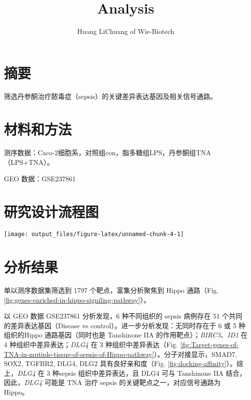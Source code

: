 \documentclass[
]{article}
\title{Analysis}
\author{Huang LiChuang of Wie-Biotech}
\date{}
\begin{document}
\maketitle

{
\setcounter{tocdepth}{3}
\tableofcontents
}
\listoffigures

\listoftables

\hypertarget{abstract}{%
\section{摘要}\label{abstract}}

筛选丹参酮治疗脓毒症（sepsis）的关键差异表达基因及相关信号通路。

\hypertarget{methods}{%
\section{材料和方法}\label{methods}}

测序数据：Caco-2细胞系，对照组con，脂多糖组LPS，丹参酮组TNA（LPS+TNA）。

GEO 数据：GSE237861

\hypertarget{route}{%
\section{研究设计流程图}\label{route}}

\texttt{[image: output\_files/figure-latex/unnamed-chunk-4-1]}

\hypertarget{results}{%
\section{分析结果}\label{results}}

单以测序数据集筛选到 1797 个靶点，富集分析聚焦到 Hippo 通路（Fig. \ref{fig:genes-enriched-in-hippo-signiling-pathway}）。

以 GEO 数据 GSE237861 分析发现，6 种不同组织的 sepsis 病例存在 51 个共同的差异表达基因（Disease vs control）。进一步分析发现：无同时存在于 6 或 5 种组织的Hippo 通路基因（同时也是 Tanshinone IIA 的作用靶点）；\emph{BIRC3}、\emph{ID1} 在 4 种组织中差异表达；\emph{DLG4} 在 3 种组织中差异表达（Fig. \ref{fig:Target-genes-of-TNA-in-mutiple-tissue-of-sepsis-of-Hippo-pathway}）。分子对接显示，SMAD7, SOX2, TGFBR2, DLG4, DLG2 具有良好亲和度（Fig. \ref{fig:docking-affinity}）。综上，\emph{DLG4} 在 3 种sepsis 组织中差异表达，且 DLG4 可与 Tanshinone IIA 结合，因此，\emph{DLG4} 可能是 TNA 治疗 sepsis 的关键靶点之一，对应信号通路为 Hippo。
\end{document}

